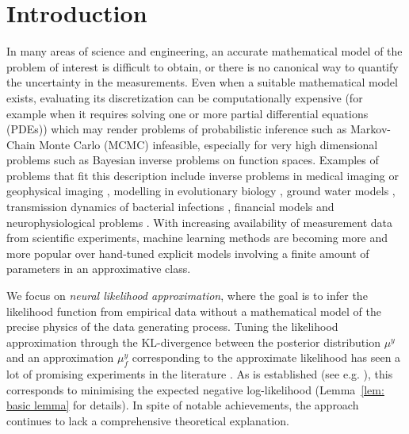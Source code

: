\documentclass{amsart}
\theoremstyle{definition}
\begin{document}
\section{Introduction}\label{s:Intro}
In many areas of science and engineering, an accurate mathematical model of the problem of interest is difficult to obtain, or there is no canonical way to quantify the uncertainty in the measurements. Even when a suitable mathematical model exists, evaluating its discretization can be computationally expensive (for example when it requires solving one or more partial differential equations (PDEs)) which may render problems of probabilistic inference such as Markov-Chain Monte Carlo (MCMC) infeasible, especially for very high dimensional problems such as Bayesian inverse problems on function spaces.
Examples of problems that fit this description include inverse problems in medical imaging \cite{arridge1999optical, Holder2005EIT} or geophysical imaging \cite{wang2025sequentialbayesiandesignefficient}, modelling in evolutionary biology \cite{Ratmann2007UsingLikelihood-free, Wood2010Statistical, Meeds2014GPS-ABC}, ground water models \cite{ZENG2025Solvinghigh-dimensional}, transmission dynamics of bacterial infections \cite{Numminen2013Estimating, Gutman2016BayesianOptimization}, financial models \cite{Ravi2004Risks, Ramona2023Bayesiansynthetic} and neurophysiological problems \cite{lueckmann2019likelihoodfree}. 
With increasing availability of measurement data from scientific experiments, machine learning methods are becoming more and more popular over hand-tuned explicit models involving a finite amount of parameters in an approximative class.

We focus on \emph{neural likelihood approximation}, where the goal is to infer the likelihood function from empirical data  without a mathematical model of the precise physics of the data generating process. 
Tuning the likelihood approximation through the KL-divergence between the posterior distribution $\mu^y$ and an approximation $\mu^y_f$ corresponding to the approximate likelihood has seen a lot of promising experiments in the literature \cite{lueckmann2019likelihoodfree, papamakarios2019sequantialneural, Balaji2017SimpleandScalable, rothfuss2019conditional}.
As is established (see e.g. \cite{papamakarios2019sequantialneural, radev2020bayesflowlearningcomplexstochastic}), this corresponds to minimising the expected negative log-likelihood (Lemma~\ref{lem: basic lemma} for details). In spite of notable achievements, the approach  continues to lack a comprehensive theoretical explanation.
\end{document}
